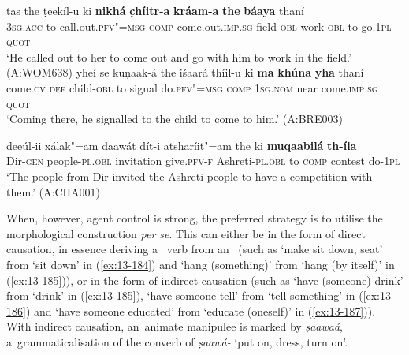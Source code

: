 \ea
\label{ex:13-181}
\gll tas the ṭeekíl-u ki \textbf{nikhá} \textbf{c̣híitr-a} \textbf{kráam-a} \textbf{the} \textbf{báaya} thaní\\
\textsc{3sg.acc} to call.out.\textsc{pfv"=msg} \textsc{comp} come.out.\textsc{imp.sg} field-\textsc{obl}  work-\textsc{obl} to go.\textsc{1pl} \textsc{quot}\\
\glt `He called out to her to come out and go with him to work in the field.' (A:WOM638)
\ex
\label{ex:13-182}
\gll yheí se kuṇaak-á the išaará thíil-u ki \textbf{ma} \textbf{khúna} \textbf{yha} thaní\\
come.\textsc{cv} \textsc{def} child-\textsc{obl} to signal do.\textsc{pfv"=msg} \textsc{comp} \textsc{1sg.nom} near come.\textsc{imp.sg} \textsc{quot}\\
\glt `Coming there, he signalled to the child to come to him.' (A:BRE003)

\ex
\label{ex:13-183}
\gll deeúl-ii xálak"=am daawát dít-i atsharíit"=am the ki \textbf{muqaabilá} \textbf{th-íia}\\
Dir-\textsc{gen}  people-\textsc{pl.obl} invitation give.\textsc{pfv-f} Ashreti-\textsc{pl.obl} to \textsc{comp} contest do-\textsc{1pl}\\
\glt `The people from Dir invited the Ashreti people to have a competition with them.' (A:CHA001) 
\z

When, however, agent control is strong, the preferred strategy is to utilise the morphological  construction \textit{per se}. This can either be in the form of direct causation, in essence deriving a~ verb from an~ (such as `make sit down, seat' from `sit down' in (\ref{ex:13-184}) and `hang (something)' from `hang (by itself)' in (\ref{ex:13-185})), or in the form of indirect causation (such as `have (someone) drink' from `drink' in (\ref{ex:13-185}), `have someone tell' from `tell something' in (\ref{ex:13-186}) and `have someone educated' from `educate (oneself)' in (\ref{ex:13-187})). With indirect causation, an~animate manipulee is marked by \textit{ṣaawaá}, a~grammaticalisation of the converb of \textit{ṣaawá-} `put on, dress, turn on'.


